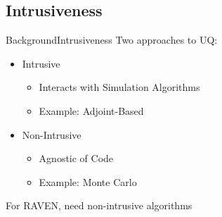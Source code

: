 \documentclass{beamer}
\begin{document}
\subsection{Intrusiveness}
\begin{frame}{Background}{Intrusiveness}\vspace{-20pt}
  Two approaches to UQ:\vspace{10pt}
  \begin{itemize}
    \item Intrusive
       \begin{itemize}
         \item Interacts with Simulation Algorithms
         \item Example: Adjoint-Based
       \end{itemize}
    \item Non-Intrusive
      \begin{itemize}
        \item Agnostic of Code
        \item Example: Monte Carlo
      \end{itemize}
  \end{itemize}\vspace{10pt}
  For RAVEN, need non-intrusive algorithms
\end{frame}
\end{document}

